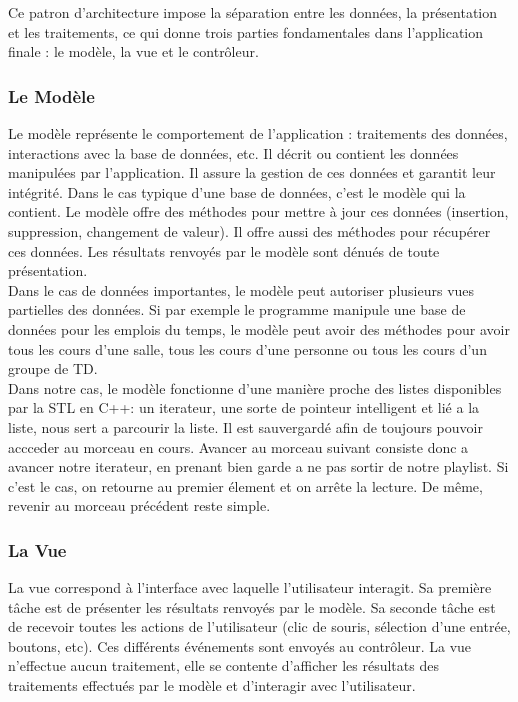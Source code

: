 \documentclass[12pt,a4paper]{report}
\begin{document}
Ce patron d'architecture impose la séparation entre les données, la présentation et les traitements, ce qui donne trois parties fondamentales dans l'application finale : le modèle, la vue et le contrôleur. \\

\subsubsection{Le Modèle}

Le modèle représente le comportement de l'application : traitements des données, interactions avec la base de données, etc. Il décrit ou contient les données manipulées par l'application. Il assure la gestion de ces données et garantit leur intégrité. Dans le cas typique d'une base de données, c'est le modèle qui la contient. Le modèle offre des méthodes pour mettre à jour ces données (insertion, suppression, changement de valeur). Il offre aussi des méthodes pour récupérer ces données. Les résultats renvoyés par le modèle sont dénués de toute présentation.\\

Dans le cas de données importantes, le modèle peut autoriser plusieurs vues partielles des données. Si par exemple le programme manipule une base de données pour les emplois du temps, le modèle peut avoir des méthodes pour avoir tous les cours d'une salle, tous les cours d'une personne ou tous les cours d'un groupe de TD.\\

Dans notre cas, le modèle fonctionne d'une manière proche des listes disponibles par la STL en C++: un iterateur, une sorte de pointeur intelligent et lié a la liste, nous sert a parcourir la liste. Il est sauvergardé afin de toujours pouvoir accceder au morceau en cours. Avancer au morceau suivant consiste donc a avancer notre iterateur, en prenant bien garde a ne pas sortir de notre playlist. Si c'est le cas, on retourne au premier élement et on arrête la lecture. De même, revenir au morceau précédent reste simple.\\

\subsubsection{La Vue}

La vue correspond à l'interface avec laquelle l'utilisateur interagit. Sa première tâche est de présenter les résultats renvoyés par le modèle. Sa seconde tâche est de recevoir toutes les actions de l'utilisateur (clic de souris, sélection d'une entrée, boutons, etc). Ces différents événements sont envoyés au contrôleur. La vue n'effectue aucun traitement, elle se contente d'afficher les résultats des traitements effectués par le modèle et d'interagir avec l'utilisateur.\\
\end{document}
